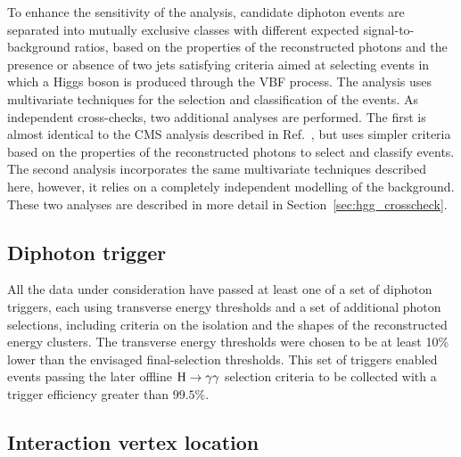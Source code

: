 \documentclass[11pt,twoside,a4paper,cmspaper,final,collab]{cms-tdr}
\begin{document}
To enhance the sensitivity of the analysis, candidate diphoton events are separated into mutually
exclusive classes with different expected signal-to-background ratios,
based on the properties of the reconstructed photons and
the presence or absence of two jets satisfying criteria aimed at selecting events
in which a Higgs boson is produced through the VBF process.
The analysis uses multivariate techniques
for the selection and classification of the events.
As independent cross-checks, two additional analyses are performed.
The first is almost identical to the CMS analysis described in Ref.~\cite{Chatrchyan:2012tw},
but uses simpler criteria based on the properties of the reconstructed photons to
select and classify events. The second analysis incorporates the same multivariate techniques
described here, however, it relies on a completely independent modelling of the background.
These two analyses are described in more detail in Section~\ref{sec:hgg_crosscheck}.



\subsection{Diphoton trigger}
\label{sec:hgg_dataReco}

All the data under consideration have passed at least one of a set of
diphoton triggers, each using transverse energy thresholds and
a set of additional photon selections, including criteria on the isolation and the shapes
of the reconstructed energy clusters. The transverse energy thresholds were chosen to be at least
10\% lower than the envisaged final-selection thresholds. This set of triggers
enabled events passing the later offline $\mathrm{H} \to \gamma\gamma$ selection criteria
to be collected with a trigger  efficiency greater than  $99.5\%$.


\subsection{Interaction vertex location}
\label{sec:hgg_vertex}
\end{document}
